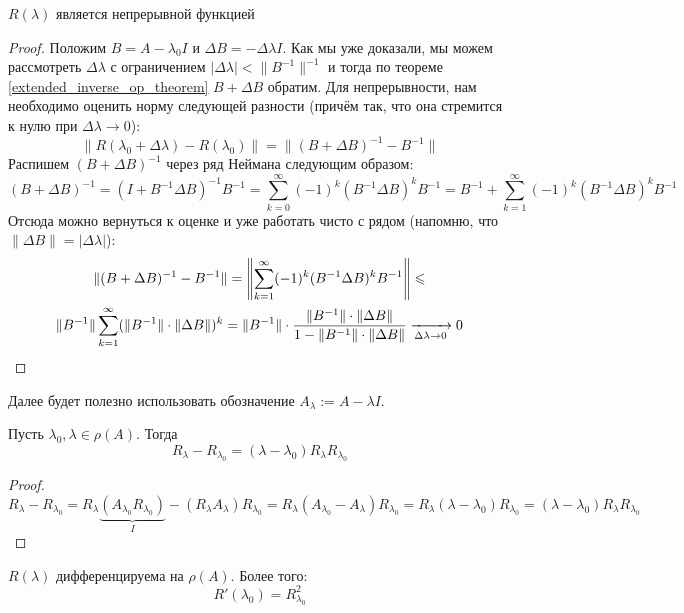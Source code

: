 \begin{proposition}
	$R(\lambda)$ является непрерывной функцией
\end{proposition}

\begin{proof}
	Положим $B = A - \lambda_0 I$ и $\Delta B = -\Delta \lambda I$. Как мы уже доказали, мы можем рассмотреть $\Delta \lambda$ с ограничением $|\Delta \lambda| < \|B^{-1}\|^{-1}$ и тогда по теореме \ref{extended_inverse_op_theorem} $B + \Delta B$ обратим. Для непрерывности, нам необходимо оценить норму следующей разности (причём так, что она стремится к нулю при $\Delta \lambda \to 0$):
	\[
		\|R(\lambda_0 + \Delta \lambda) - R(\lambda_0)\| = \|(B + \Delta B)^{-1} - B^{-1}\|
	\]
	Распишем $(B + \Delta B)^{-1}$ через ряд Неймана следующим образом:
	\[
		(B + \Delta B)^{-1} = (I + B^{-1}\Delta B)^{-1}B^{-1} = \sum_{k = 0}^\infty (-1)^k (B^{-1}\Delta B)^k B^{-1} = B^{-1} + \sum_{k = 1}^\infty (-1)^k (B^{-1}\Delta B)^kB^{-1}
	\]
	Отсюда можно вернуться к оценке и уже работать чисто с рядом (напомню, что $\|\Delta B\| = |\Delta \lambda|$):
	\begin{multline*}
		\|(B + \Delta B)^{-1} - B^{-1}\| = \left\|\sum_{k = 1}^\infty (-1)^k(B^{-1}\Delta B)^kB^{-1}\right\| \leqslant
		\\
		\|B^{-1}\|\sum_{k = 1}^\infty (\|B^{-1}\| \cdot \|\Delta B\|)^k = \|B^{-1}\| \cdot \frac{\|B^{-1}\| \cdot \|\Delta B\|}{1 - \|B^{-1}\| \cdot \|\Delta B\|} \xrightarrow[\Delta \lambda \to 0]{} 0
	\end{multline*}
\end{proof}

\begin{note}
	Далее будет полезно использовать обозначение $A_\lambda := A - \lambda I$.
\end{note}

\begin{proposition}
	Пусть $\lambda_0, \lambda \in \rho(A)$. Тогда
	\[
		R_\lambda - R_{\lambda_0} = (\lambda - \lambda_0)R_\lambda R_{\lambda_0}
	\]
\end{proposition}

\begin{proof}
	\[
		R_\lambda - R_{\lambda_0} = R_\lambda \underbrace{(A_{\lambda_0} R_{\lambda_0})}_{I} - (R_\lambda A_\lambda) R_{\lambda_0} = R_\lambda (A_{\lambda_0} - A_\lambda)R_{\lambda_0} = R_\lambda (\lambda - \lambda_0)R_{\lambda_0} = (\lambda - \lambda_0)R_\lambda R_{\lambda_0}
	\]
\end{proof}

\begin{proposition}
	$R(\lambda)$ дифференцируема на $\rho(A)$. Более того:
	\[
		R'(\lambda_0) = R_{\lambda_0}^2
	\]
\end{proposition}

